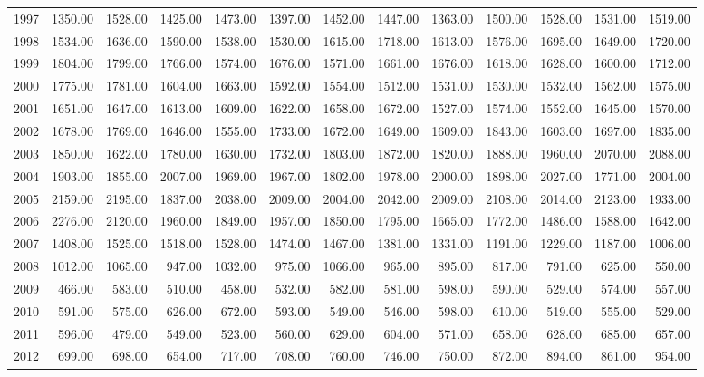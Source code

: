 \begin{longtable}{rrrrrrrrrrrrr}
  1997 & 1350.00 & 1528.00 & 1425.00 & 1473.00 & 1397.00 & 1452.00 & 1447.00 & 1363.00 & 1500.00 & 1528.00 & 1531.00 & 1519.00 \\ 
  1998 & 1534.00 & 1636.00 & 1590.00 & 1538.00 & 1530.00 & 1615.00 & 1718.00 & 1613.00 & 1576.00 & 1695.00 & 1649.00 & 1720.00 \\ 
  1999 & 1804.00 & 1799.00 & 1766.00 & 1574.00 & 1676.00 & 1571.00 & 1661.00 & 1676.00 & 1618.00 & 1628.00 & 1600.00 & 1712.00 \\ 
  2000 & 1775.00 & 1781.00 & 1604.00 & 1663.00 & 1592.00 & 1554.00 & 1512.00 & 1531.00 & 1530.00 & 1532.00 & 1562.00 & 1575.00 \\ 
  2001 & 1651.00 & 1647.00 & 1613.00 & 1609.00 & 1622.00 & 1658.00 & 1672.00 & 1527.00 & 1574.00 & 1552.00 & 1645.00 & 1570.00 \\ 
  2002 & 1678.00 & 1769.00 & 1646.00 & 1555.00 & 1733.00 & 1672.00 & 1649.00 & 1609.00 & 1843.00 & 1603.00 & 1697.00 & 1835.00 \\ 
  2003 & 1850.00 & 1622.00 & 1780.00 & 1630.00 & 1732.00 & 1803.00 & 1872.00 & 1820.00 & 1888.00 & 1960.00 & 2070.00 & 2088.00 \\ 
  2004 & 1903.00 & 1855.00 & 2007.00 & 1969.00 & 1967.00 & 1802.00 & 1978.00 & 2000.00 & 1898.00 & 2027.00 & 1771.00 & 2004.00 \\ 
  2005 & 2159.00 & 2195.00 & 1837.00 & 2038.00 & 2009.00 & 2004.00 & 2042.00 & 2009.00 & 2108.00 & 2014.00 & 2123.00 & 1933.00 \\ 
  2006 & 2276.00 & 2120.00 & 1960.00 & 1849.00 & 1957.00 & 1850.00 & 1795.00 & 1665.00 & 1772.00 & 1486.00 & 1588.00 & 1642.00 \\ 
  2007 & 1408.00 & 1525.00 & 1518.00 & 1528.00 & 1474.00 & 1467.00 & 1381.00 & 1331.00 & 1191.00 & 1229.00 & 1187.00 & 1006.00 \\ 
  2008 & 1012.00 & 1065.00 & 947.00 & 1032.00 & 975.00 & 1066.00 & 965.00 & 895.00 & 817.00 & 791.00 & 625.00 & 550.00 \\ 
  2009 & 466.00 & 583.00 & 510.00 & 458.00 & 532.00 & 582.00 & 581.00 & 598.00 & 590.00 & 529.00 & 574.00 & 557.00 \\ 
  2010 & 591.00 & 575.00 & 626.00 & 672.00 & 593.00 & 549.00 & 546.00 & 598.00 & 610.00 & 519.00 & 555.00 & 529.00 \\ 
  2011 & 596.00 & 479.00 & 549.00 & 523.00 & 560.00 & 629.00 & 604.00 & 571.00 & 658.00 & 628.00 & 685.00 & 657.00 \\ 
  2012 & 699.00 & 698.00 & 654.00 & 717.00 & 708.00 & 760.00 & 746.00 & 750.00 & 872.00 & 894.00 & 861.00 & 954.00 \\ 

\end{longtable}

